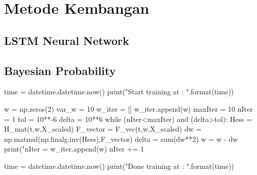 \chapter{Metode Kembangan}

\section{LSTM Neural Network}
\blindtext

\section{Bayesian Probability}
\blindtext

\begin{python}
    time = datetime.datetime.now()
    print("Start training at : {}".format(time))
    
    w = np.zeros(2)
    var_w = 10
    w_iter = []
    w_iter.append(w)
    maxIter = 10
    nIter = 1
    tol = 10**-6
    delta = 10**6
    while (nIter<maxIter) and (delta>tol):
        Hess = H_mat(t,w,X_scaled)
        F_vector = F_vec(t,w,X_scaled)
        dw = np.matmul(np.linalg.inv(Hess),F_vector)
        delta = sum(dw**2)
        w = w - dw
        print("nIter = %
        w_iter.append(w)
        nIter += 1
    
    time = datetime.datetime.now()
    print("Done training at : {}".format(time))

\end{python}

